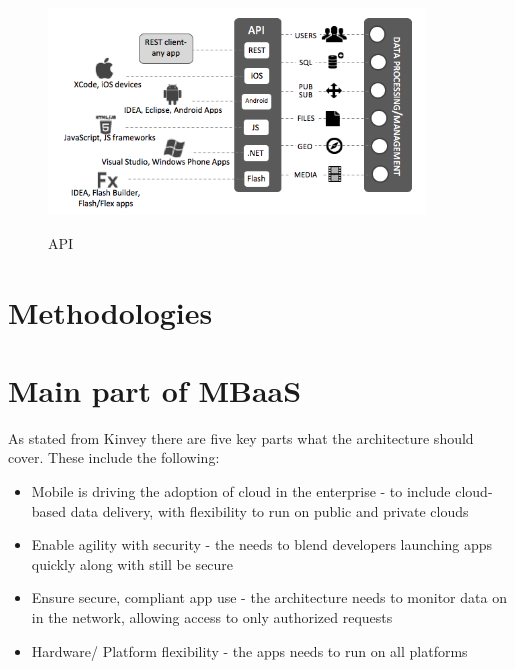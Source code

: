 \begin{figure}[!h]
    \caption{API}
    \centering
    \includegraphics[width=100mm]{images/baas-apis}
    \label{fig:api}
\end{figure}


\section{Methodologies}


\section{Main part of MBaaS}

As stated from Kinvey \cite{kinveywebsite} there are five key parts what the architecture should cover. These include the following:

\begin{itemize}
  \item Mobile is driving the adoption of cloud in the enterprise
    - to include cloud-based data delivery, with flexibility to run on public and private clouds
  \item Enable agility with security
    - the needs to blend developers launching apps quickly along with still be secure
  \item Ensure secure, compliant app use
    - the architecture needs to monitor data on in the network, allowing access to only authorized requests
  \item Hardware/ Platform flexibility 
    - the apps needs to run on all platforms
\end{itemize}
